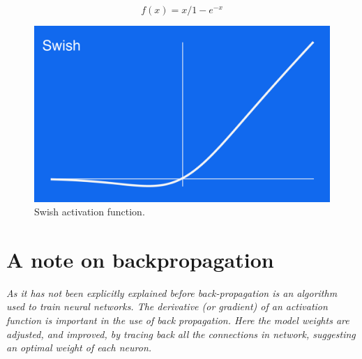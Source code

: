 \begin{equation}
f(x) = x/1-e^{-x}
  \end{equation}
\begin{figure}[H]
\centering
\includegraphics[width=.265\textwidth]{4fig/swish.png}
\caption{Swish activation function.}
\end{figure}

\section{\textbf{A note on backpropagation}}
\emph{As it has not been explicitly explained before back-propagation is an algorithm used to train neural networks. The derivative (or gradient) of an activation function is important in the use of back propagation. Here the model weights are adjusted, and improved, by tracing back all the connections in network, suggesting an optimal weight of each neuron.}
